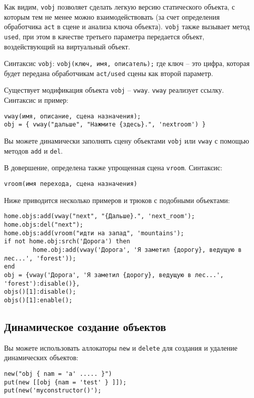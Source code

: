 \documentclass[a4paper,12pt]{article}
\begin{document}
Как видим, \verb/vobj/ позволяет сделать легкую версию статического объекта, с которым тем не менее можно взаимодействовать (за счет определения обработчика \verb/act/ в сцене и анализа ключа объекта). \verb/vobj/ также вызывает метод \verb/used/, при этом в качестве третьего параметра передается объект, воздействующий на виртуальный объект.

Синтаксис \verb/vobj/: \verb/vobj(ключ, имя, описатель);/ где ключ -- это цифра, которая будет передана обработчикам \verb.act/used. сцены как второй параметр.

Существует модификация объекта \verb/vobj/ -- \verb/vway/. \verb/vway/ реализует ссылку. Синтаксис и пример:

\begin{verbatim}
vway(имя, описание, сцена назначения);
obj = { vway("дальше", "Нажмите {здесь}.", 'nextroom') }
\end{verbatim}

Вы можете динамически заполнять сцену объектами \verb/vobj/ или \verb/vway/ с помощью методов \verb/add/ и \verb/del/.

В довершение, определена также упрощенная сцена \verb/vroom/. Синтаксис:

\begin{verbatim}
vroom(имя перехода, сцена назначения)
\end{verbatim}

Ниже приводится несколько примеров и трюков с подобными объектами:

\begin{verbatim}
home.objs:add(vway("next", "{Дальше}.", 'next_room');
home.objs:del("next");
home.objs:add(vroom("идти на запад", 'mountains');
if not home.obj:srch('Дорога') then
        home.obj:add(vway('Дорога', 'Я заметил {дорогу}, ведущую в лес...', 'forest'));
end
obj = {vway('Дорога', 'Я заметил {дорогу}, ведущую в лес...', 'forest'):disable()},
objs()[1]:disable();
objs()[1]:enable();
\end{verbatim}

\subsection{Динамическое создание объектов}

Вы можете использовать аллокаторы \verb/new/ и \verb/delete/ для создания и удаление динамических объектов:

\begin{verbatim}
new("obj { nam = 'a' ..... }")
put(new [[obj {nam = 'test' } ]]);
put(new('myconstructor()');
\end{verbatim}
\end{document}

